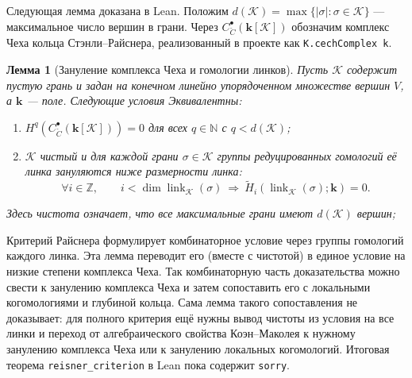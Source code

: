 \documentclass[11pt]{amsart}
\newtheorem{lemma}{Лемма}[section]
\begin{document}
Следующая лемма доказана в Lean. Положим
$d(\mathcal{K})=\max\{|\sigma|:\sigma\in\mathcal{K}\}$ — максимальное
число вершин в грани. Через
$C^\bullet_{\check C}(\mathbf{k}[\mathcal{K}])$ обозначим
комплекс Чеха кольца
Стэнли--Райснера, реализованный в проекте как
\texttt{K.cechComplex k}.

\begin{lemma}[Зануление комплекса Чеха и гомологии линков]\label{lem:cech-link-homology}
Пусть $\mathcal{K}$ содержит пустую грань и задан на конечном
линейно упорядоченном множестве вершин $V$, а $\mathbf{k}$ — поле.
Следующие условия Эквивалентны:
\begin{enumerate}
\item $H^q(C^\bullet_{\check C}(\mathbf{k}[\mathcal{K}]))=0$ для всех
      $q\in\mathbb N$ с $q<d(\mathcal{K})$;
\item $\mathcal{K}$ чистый и для каждой грани $\sigma\in\mathcal{K}$ группы
      редуцированных гомологий её линка зануляются ниже размерности линка:
      \[
        \forall i\in\mathbb Z,\qquad
        i<\dim\operatorname{link}_{\mathcal{K}}(\sigma)
        \ \Longrightarrow\
        \widetilde H_i(\operatorname{link}_{\mathcal{K}}(\sigma);\mathbf{k})=0.
      \]
\end{enumerate}
Здесь чистота означает, что все максимальные грани имеют $d(\mathcal{K})$ вершин;
\end{lemma}

Критерий Райснера формулирует комбинаторное условие через группы гомологий
каждого линка. Эта лемма переводит его (вместе с чистотой) в единое условие на
низкие степени комплекса Чеха. Так комбинаторную часть доказательства можно
свести к занулению комплекса Чеха и затем сопоставить его с локальными
когомологиями и глубиной кольца. Сама лемма такого сопоставления не доказывает:
для полного критерия ещё нужны вывод чистоты из условия на все линки и переход
от алгебраического свойства Коэн--Маколея к нужному занулению комплекса Чеха
или к занулению локальных когомологий. Итоговая теорема
\texttt{reisner\_criterion} в Lean пока содержит \texttt{sorry}.
\end{document}
